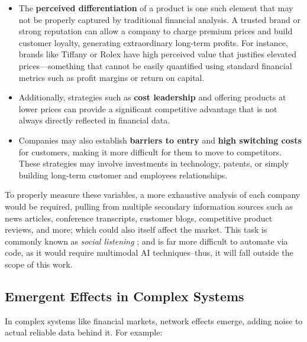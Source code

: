 \documentclass[11pt,english,a4paper,hidelinks]{book}
\begin{document}
\begin{itemize}
    \item The \textbf{perceived differentiation} of a product is one such element that may not be properly captured by traditional financial analysis. A trusted brand or strong reputation can allow a company to charge premium prices and build customer loyalty, generating extraordinary long-term profits. For instance, brands like Tiffany or Rolex have high perceived value that justifies elevated prices—something that cannot be easily quantified using standard financial metrics such as profit margins or return on capital.

    \item Additionally, strategies such as \textbf{cost leadership} and offering products at lower prices can provide a significant competitive advantage that is not always directly reflected in financial data.

    \item Companies may also establish \textbf{barriers to entry} and \textbf{high switching costs} for customers, making it more difficult for them to move to competitors. These strategies may involve investments in technology, patents, or simply building long-term customer and employees relationships.
\end{itemize}

\noindent To properly measure these variables, a more exhaustive analysis of each company would be required, pulling from multiple secondary information sources such as news articles, conference transcripts, customer blogs, competitive product reviews, and more; which could also itself affect the market. This task is commonly known as \textit{social listening} \cite{WANG2022110598}; and is far more difficult to automate via code, as it would require multimodal AI techniques--thus, it will fall outside the scope of this work.

\subsection{Emergent Effects in Complex Systems}

\noindent In complex systems like financial markets, network effects emerge, adding noise to actual reliable data behind it. For example:
\end{document}
